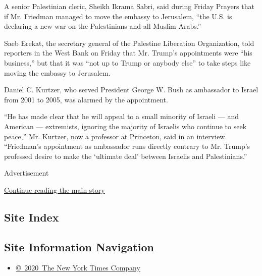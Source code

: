 A senior Palestinian cleric, Sheikh Ikrama Sabri, said during Friday
Prayers that if Mr. Friedman managed to move the embassy to Jerusalem,
``the U.S. is declaring a new war on the Palestinians and all Muslim
Arabs.''

Saeb Erekat, the secretary general of the Palestine Liberation
Organization, told reporters in the West Bank on Friday that Mr. Trump's
appointments were ``his business,'' but that it was ``not up to Trump or
anybody else'' to take steps like moving the embassy to Jerusalem.

Daniel C. Kurtzer, who served President George W. Bush as ambassador to
Israel from 2001 to 2005, was alarmed by the appointment.

``He has made clear that he will appeal to a small minority of Israeli
--- and American --- extremists, ignoring the majority of Israelis who
continue to seek peace,'' Mr. Kurtzer, now a professor at Princeton,
said in an interview. ``Friedman's appointment as ambassador runs
directly contrary to Mr. Trump's professed desire to make the `ultimate
deal' between Israelis and Palestinians.''

Advertisement

\protect\hyperlink{after-bottom}{Continue reading the main story}

\hypertarget{site-index}{%
\subsection{Site Index}\label{site-index}}

\hypertarget{site-information-navigation}{%
\subsection{Site Information
Navigation}\label{site-information-navigation}}

\begin{itemize}
\tightlist
\item
  \href{https://help.nytimes.com/hc/en-us/articles/115014792127-Copyright-notice}{©~2020~The
  New York Times Company}
\end{itemize}

